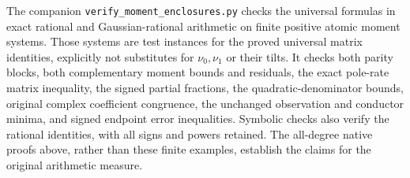 \documentclass[11pt]{article}
\begin{document}
The companion \texttt{verify\_moment\_enclosures.py} checks the
universal formulas in exact rational and Gaussian-rational arithmetic
on finite positive atomic moment systems.  Those systems are test
instances for the proved universal matrix identities, explicitly not
substitutes for $\nu_0,\nu_1$ or their tilts.  It checks both parity
blocks, both complementary moment bounds and residuals, the exact
pole-rate matrix inequality, the signed partial fractions, the
quadratic-denominator bounds, original complex coefficient congruence,
the unchanged observation and conductor minima, and signed endpoint
error inequalities.  Symbolic checks also verify the rational
identities, with all signs and powers retained.  The all-degree native
proofs above, rather than these finite examples, establish the claims
for the original arithmetic measure.
\end{document}
